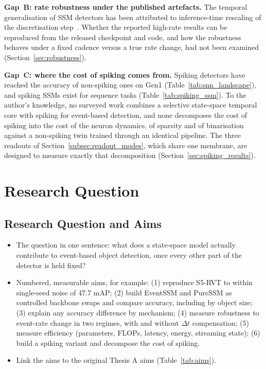 \documentclass[11pt, a4paper]{report}
\newcommand{\Dt}{$\Delta t$}
\begin{document}
\textbf{Gap~B: rate robustness under the published artefacts.} The temporal generalisation of SSM detectors
has been attributed to inference-time rescaling of the discretisation step~\cite{zubic2024state}. Whether
the reported high-rate results can be reproduced from the released checkpoint and code, and how the
robustness behaves under a fixed cadence versus a true rate change, had not been examined
(Section~\ref{sec:robustness}).

\textbf{Gap~C: where the cost of spiking comes from.} Spiking detectors have reached the accuracy of
non-spiking ones on Gen1 (Table~\ref{tab:snn_landscape}), and spiking SSMs exist for sequence tasks
(Table~\ref{tab:spiking_ssm}). To the author's knowledge, no surveyed work combines a selective state-space
temporal core with spiking for event-based detection, and none decomposes the cost of spiking into the cost
of the neuron dynamics, of sparsity and of binarisation against a non-spiking twin trained through an
identical pipeline. The three readouts of Section~\ref{subsec:readout_modes}, which share one membrane, are
designed to measure exactly that decomposition (Section~\ref{sec:spiking_results}).

\chapter{Research Question}
\label{ch:research_question}
\section{Research Question and Aims}
\begin{itemize}
  \item The question in one sentence: what does a state-space model actually contribute to event-based object detection, once every other part of the detector is held fixed?
  \item Numbered, measurable aims, for example: (1) reproduce S5-RVT to within single-seed noise of 47.7 mAP; (2) build EventSSM and PureSSM as controlled backbone swaps and compare accuracy, including by object size; (3) explain any accuracy difference by mechanism; (4) measure robustness to event-rate change in two regimes, with and without \Dt{} compensation; (5) measure efficiency (parameters, FLOPs, latency, energy, streaming state); (6) build a spiking variant and decompose the cost of spiking.
  \item Link the aims to the original Thesis A aims (Table~\ref{tab:aims}).
\end{itemize}
\end{document}
